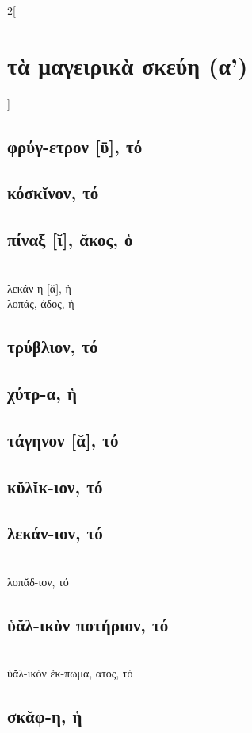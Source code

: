 \documentclass{book}
\begin{document}
\begin{multicols}{2}[\section{τὰ μαγειρικὰ σκεύη (α')}]
\subsection{φρύγ-ετρον [ῡ], τό}
\subsection{κόσκῐνον, τό}
\subsection{πίναξ [ῐ], ᾰκος, ὁ}
 ~\\
λεκάν-η [ᾰ], ἡ
 ~\\
λοπάς, άδος, ἡ
\subsection{τρύβλιον, τό}
\subsection{χύτρ-α, ἡ}
\subsection{τάγηνον [ᾰ], τό}
\subsection{κῠλῐκ-ιον, τό}
\subsection{λεκάν-ιον, τό}
 ~\\
λοπᾰδ-ιον, τό
\subsection{ὑᾰλ-ικὸν ποτήριον, τό}
 ~\\
ὑᾰλ-ικὸν ἔκ-πωμα, ατος, τό
\subsection{σκᾰφ-η, ἡ}

\end{multicols}
\end{document}
